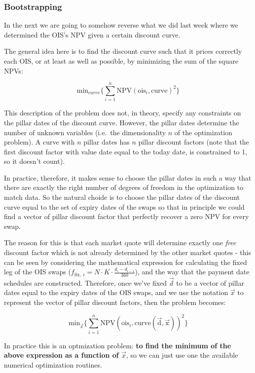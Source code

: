 \documentclass[11pt]{article}
\begin{document}
    \hypertarget{bootstrapping}{%
\subsubsection{Bootstrapping}\label{bootstrapping}}

In the next we are going to somehow reverse what we did last week where
we determined the OIS's NPV given a certain discount curve.

The general idea here is to find the discount curve such that it prices
correctly each OIS, or at least as well as possible, by minimizing the
sum of the square NPVs:

\[\mathrm{min}_{curve} \Big\{\sum_{i=1}^{n}\mathrm{NPV}(\mathrm{ois}_i, \mathrm{curve})^2\Big\}\]

This description of the problem does not, in theory, specify any
constraints on the pillar dates of the discount curve. However, the
pillar dates determine the number of unknown variables (i.e.~the
dimensionality \(n\) of the optimization problem). A curve with \(n\)
pillar dates has \(n\) pillar discount factors (note that the first
discount factor with value date equal to the today date, is constrained
to 1, so it doesn't count).

In practice, therefore, it makes sense to choose the pillar dates in
such a way that there are exactly the right number of degrees of freedom
in the optimization to match data. So the natural choide is to choose
the pillar dates of the discount curve equal to the set of expiry dates
of the swaps so that in principle we could find a vector of pillar
discount factor that perfectly recover a zero NPV for every swap.

The reason for this is that each market quote will determine exactly one
\emph{free} discount factor which is not already determined by the other
market quotes - this can be seen by considering the mathematical
expression for calculating the fixed leg of the OIS swaps
(\(f_{\mathrm{fix},~i}=N\cdot K\cdot \frac{d_i - d_{i-1}}{360}\)), and
the way that the payment date schedules are constructed. Therefore, once
we've fixed \(\vec{d}\) to be a vector of pillar dates equal to the
expiry dates of the OIS swaps, and we use the notation \(\vec{x}\) to
represent the vector of pillar discount factors, then the problem
becomes:

\[\mathrm{min}_{\vec{x}} \Big\{\sum_{i=1}^{n}\mathrm{NPV}(\mathrm{ois}_i, \mathrm{curve(\vec{d}, \vec{x})})^2\Big\}\]

In practice this is an optmization problem: \textbf{to find the minimum
of the above expression as a function of \(\vec{x}\)}, so we can just
use one the available numerical optimization routines.
\end{document}
